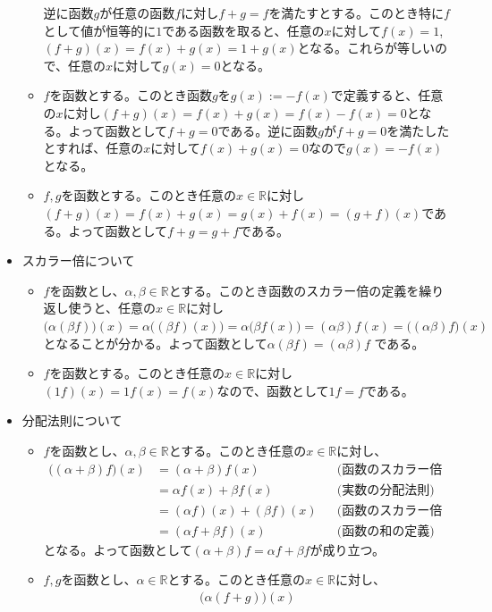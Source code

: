 \begin{itemize}
\begin{itemize}
逆に函数$g$が任意の函数$f$に対し$f + g = f$を満たすとする。このとき特に$f$として値が恒等的に$1$である函数を取ると、任意の$x$に対して$f(x) = 1$, $(f + g)(x) = f(x) + g(x) = 1 + g(x)$となる。これらが等しいので、任意の$x$に対して$g(x) = 0$となる。
\item $f$を函数とする。このとき函数$g$を$g(x) := -f(x)$で定義すると、任意の$x$に対し$(f + g)(x) = f(x) + g(x) = f(x) - f(x) =0$となる。よって函数として$f + g = 0$である。逆に函数$g$が$f + g = 0$を満たしたとすれば、任意の$x$に対して$f(x) + g(x) = 0$なので$g(x) = -f(x)$となる。
\item $f, g$を函数とする。このとき任意の$x\in\mathbb{R}$に対し$(f + g)(x) = f(x) + g(x) = g(x) + f(x) = (g + f)(x)$である。よって函数として$f + g = g + f$である。
\end{itemize}
\item スカラー倍について
\begin{itemize}
\item $f$を函数とし、$\alpha,\beta\in\mathbb{R}$とする。このとき函数のスカラー倍の定義を繰り返し使うと、任意の$x\in\mathbb{R}$に対し$\bigl(\alpha(\beta f)\bigr)(x) = \alpha\bigl((\beta f)(x)\bigr) = \alpha\bigl(\beta f(x)\bigr) = (\alpha \beta)f(x) = \bigl((\alpha\beta)f\bigr)(x)$となることが分かる。よって函数として$\alpha(\beta f) = (\alpha \beta)f$ である。
\item $f$を函数とする。このとき任意の$x\in\mathbb{R}$に対し$(1f)(x) = 1f(x) = f(x)$なので、函数として$1f = f$である。
\end{itemize}
\item 分配法則について
\begin{itemize}
\item $f$を函数とし、$\alpha, \beta\in\mathbb{R}$とする。このとき任意の$x\in\mathbb{R}$に対し、
\begin{align*}
\bigl((\alpha + \beta)f\bigr)(x)
&= (\alpha + \beta)f(x) & & \text{(函数のスカラー倍の定義)} \\
&= \alpha f(x) + \beta f(x) & & \text{(実数の分配法則)} \\
&= (\alpha f)(x) + (\beta f)(x) & & \text{(函数のスカラー倍の定義)} \\
&= (\alpha f  + \beta f)(x) & & \text{(函数の和の定義)}
\end{align*}
となる。よって函数として$(\alpha + \beta)f = \alpha f + \beta f$が成り立つ。
\item $f, g$を函数とし、$\alpha\in\mathbb{R}$とする。このとき任意の$x\in\mathbb{R}$に対し、
\begin{align*}
\bigl(\alpha(f + g)\bigr)(x)

\end{align*}
\end{itemize}
\end{itemize}
